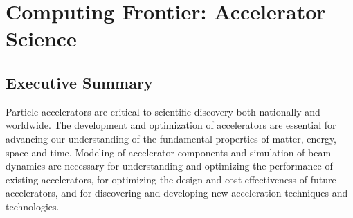  
\chapter{Computing Frontier: Accelerator Science}
\label{chap:mag}


\begin{center}\begin{boldmath}



\end{boldmath}\end{center}


\section{Executive Summary}
\label{sec:comp-exec}

Particle accelerators are critical to scientific discovery both nationally and worldwide. The development and optimization of accelerators are essential for advancing our understanding of the fundamental properties of matter, energy, space and time. Modeling of accelerator components and simulation of beam dynamics are necessary for understanding and optimizing the performance of existing accelerators, for optimizing the design and cost effectiveness of future accelerators, and for discovering and developing new acceleration techniques and technologies.

